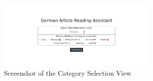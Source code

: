 \begin{figure}
	\caption{Screenshot of the Category Selection View}
	\label{fig:view1}
	\begin{center}
	\includegraphics[width=0.7\textwidth]{Graphics/View1}
	\end{center}
\end{figure}